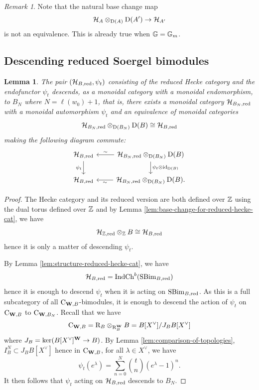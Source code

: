 \documentclass[a4paper, 10pt, oneside, reqno]{amsart}
\theoremstyle{plain}
\newtheorem{lem}[thm]{Lemma}
\theoremstyle{definition}
\theoremstyle{remark}
\newtheorem{rque}[thm]{Remark}
\newcommand{\Gbb}{\mathbb{G}}
\newcommand{\RR}{\mathrm{R}}
\newcommand{\Cc}{\mathrm{C}}
\begin{document}
\begin{rque}
Note that the natural base change map 
$$\mathcal{H}_{A} \otimes_{\mathrm{D}(A)} \mathrm{D}(A') \to \mathcal{H}_{A'}$$
is not an equivalence. This is already true when $\Gbb = \Gm$. 
\end{rque} 

\subsection{Descending reduced Soergel bimodules}

\begin{lem}\label{lem:existence-descent-datum}
The pair $(\mathcal{H}_{B, \mathrm{red}}, \psi_t)$ consisting of the reduced Hecke category and the endofunctor $\psi_t$ descends, as a monoidal category with a monoidal endomorphism, to $B_N$ where $N = \ell(w_0)+1$, that is, there exists a monoidal category $\mathcal{H}_{B_N, \mathrm{red}}$ with a monoidal automorphism $\psi_t$ and an equivalence of monoidal categories
$$\mathcal{H}_{B_N, \mathrm{red}} \otimes_{\mathrm{D}(B_N)} \mathrm{D}(B) \cong \mathcal{H}_{B,\mathrm{red}}$$
making the following diagram commute: 
\[\begin{tikzcd}
	{\Hcal_{B,\red} } & {\Hcal_{B_N,\red} \otimes_{\DD(B_N)} \DD(B)} \\
	{\Hcal_{B,\red} } & {\Hcal_{B_N,\red} \otimes_{\DD(B_N)} \DD(B).}
	\arrow["{\psi_t}"', from=1-1, to=2-1]
	\arrow["\sim"', from=1-2, to=1-1]
	\arrow["{\psi_t \otimes \id_{\DD(B)}}", from=1-2, to=2-2]
	\arrow["\sim", from=2-2, to=2-1]
\end{tikzcd}\]
\end{lem}

\begin{proof}
The Hecke category and its reduced version are both defined over $\mathbb{Z}$ using the dual torus defined over $\mathbb{Z}$ and by Lemma \ref{lem:base-change-for-reduced-hecke-cat}, we have 
$$\mathcal{H}_{\mathbb{Z},\mathrm{red}} \otimes_{\mathbb{Z}} B \cong \mathcal{H}_{B, \mathrm{red}}$$
hence it is only a matter of descending $\psi_t$. 

By Lemma \ref{lem:structure-reduced-hecke-cat}, we have 
$$\mathcal{H}_{B,\mathrm{red}} = \mathrm{Ind} \mathrm{Ch}^b(\mathrm{SBim}_{B, \mathrm{red}})$$
hence it is enough to descend $\psi_t$ when it is acting on $\mathrm{SBim}_{B,\mathrm{red}}$. As this is a full subcategory of all $\Cc_{\Wbf, B}$-bimodules, it is enough to descend the action of $\psi_t$ on $\Cc_{\Wbf, B}$ to $\Cc_{\Wbf, B_N}$. Recall that we have 
$$\Cc_{\Wbf, B} = \RR_{B} \otimes_{\RR_B^{\Wbf}} B = B[X^{\vee}]/J_BB[X^{\vee}]$$
where $J_B = \ker(B[X^{\vee}]^{\mathbf{W}} \to B)$. By Lemma \ref{lem:comparison-of-topologies}, $I_B^N \subset J_BB[X^{\vee}]$ hence in $\Cc_{\Wbf, B}$, for all $\lambda \in X^{\vee}$, we have 
$$\psi_t(e^{\lambda}) = \sum_{n = 0}^N \binom{t}{n}(e^{\lambda} - 1)^n.$$
It then follows that $\psi_t$ acting on $\mathcal{H}_{B, \mathrm{red}}$ descends to $B_N$. 
\end{proof}
\end{document}

